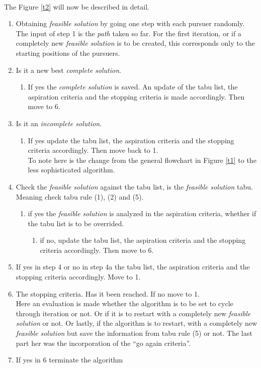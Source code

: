 \\The Figure \ref{t2} will now be described in detail.
\begin{enumerate}
\item{}Obtaining \emph{feasible solution} by going one step with each pursuer randomly. \vspace{0,1cm}\\ 
The input of step 1 is the \emph{path} taken so far. For the first iteration, or if a completely new \emph{feasible solution} is to be created, this corresponds only to the starting positions of the pursuers. 
\item{} Is it a new best \emph{complete solution}.
\begin{enumerate}
\item{} If yes the \emph{complete solution} is saved. An update of the tabu list, the aspiration criteria and the stopping criteria is made accordingly. Then move to 6.
\end{enumerate}
\item{} Is it an \emph{incomplete solution}.
\begin{enumerate}
\item{} If yes update the tabu list, the aspiration criteria and the stopping criteria accordingly. Then move back to 1. \vspace{0,1cm}\\
To note here is the change from the general flowchart in Figure \ref{t1} to the less sophisticated algorithm. 
\end{enumerate}
\item{} Check the \emph{feasible solution} against the tabu list, is the \emph{feasible solution} tabu. \vspace{0,1cm}\\
Meaning check tabu rule (1), (2) and (5).
\begin{enumerate}
\item{} if yes the \emph{feasible solution} is analyzed in the aspiration criteria, whether if the tabu list is to be overrided.
 \begin{enumerate}
\item{} if no, update the tabu list, the aspiration criteria and the stopping criteria accordingly. Then move to 6.
\end{enumerate}
\end{enumerate}
\item{} If yes in step 4 or no in step 4a the tabu list, the aspiration criteria and the stopping criteria accordingly. Move to 1.
\item{} The stopping criteria. Has it been reached. If no move to 1. \vspace{0,1cm}\\
Here an evaluation is made whether the algorithm is to be set to cycle through iteration or not. Or if it is to restart with a completely new \emph{feasible solution} or not. 
Or lastly, if the algorithm is to restart, with a completely new \emph{feasible solution} but save the information from tabu rule (5) or not. The last part her was the incorporation of the ``go again criteria''.
\item{} If yes in 6 terminate the algorithm
\end{enumerate}

